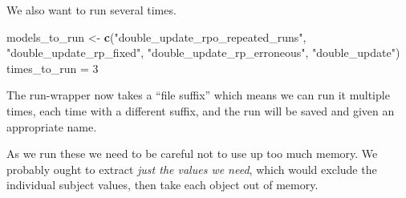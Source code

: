 \documentclass[]{article}
\newenvironment{Shaded}{\begin{snugshade}}{\end{snugshade}}
\newcommand{\KeywordTok}[1]{\textcolor[rgb]{0.13,0.29,0.53}{\textbf{{#1}}}}
\newcommand{\DecValTok}[1]{\textcolor[rgb]{0.00,0.00,0.81}{{#1}}}
\newcommand{\StringTok}[1]{\textcolor[rgb]{0.31,0.60,0.02}{{#1}}}
\newcommand{\NormalTok}[1]{{#1}}
\begin{document}
We also want to run several times.

\begin{Shaded}
\begin{Highlighting}[]
\NormalTok{models_to_run <-}\StringTok{ }\KeywordTok{c}\NormalTok{(}\StringTok{"double_update_rpo_repeated_runs"}\NormalTok{, }\StringTok{"double_update_rp_fixed"}\NormalTok{, }
    \StringTok{"double_update_rp_erroneous"}\NormalTok{, }\StringTok{"double_update"}\NormalTok{)}
\NormalTok{times_to_run =}\StringTok{ }\DecValTok{3}
\end{Highlighting}
\end{Shaded}

The run-wrapper now takes a ``file suffix'' which means we can run it
multiple times, each time with a different suffix, and the run will be
saved and given an appropriate name.

As we run these we need to be careful not to use up too much memory. We
probably ought to extract \emph{just the values we need}, which would
exclude the individual subject values, then take each object out of
memory.
\end{document}
